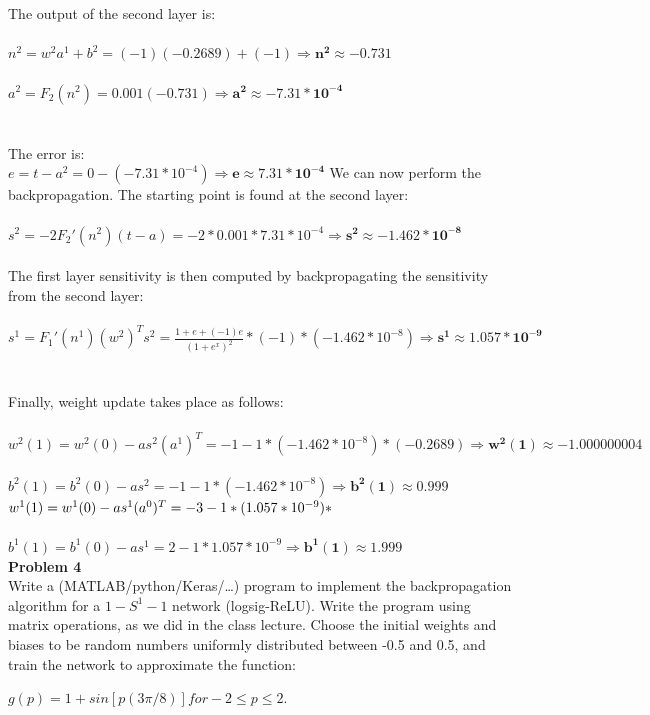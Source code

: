 \documentclass{article}
\begin{document}
\noindent \\ \\The output of the second layer is: \\ \\$n^2 = w^2a^1 + b^2 = (-1)(-0.2689) + (-1) \Rightarrow \bm{n^2 \approx -0.731}$
\\ \\$a^2 = F_2(n^2) = 0.001(-0.731) \Rightarrow \bm{a^2 \approx -7.31 * 10^{-4}}$
\\ \\ \\The error is: \\$e = t - a^2 = 0 - (-7.31 * 10^{-4}) \Rightarrow \bm{e \approx 7.31 * 10^{-4}}$ 
\newpage 
\noindent We can now perform the backpropagation. The starting point is found at the second layer: \\ \\
$s^2 = -2F_2'(n^2)(t-a) = -2 * 0.001 * 7.31 * 10^{-4} \Rightarrow \bm{s^2 \approx -1.462 * 10^{-8}}$
\\\\ The first layer sensitivity is then computed by backpropagating the sensitivity from the second layer: \\ \\ $s^1 = F_1'(n^1)(w^2)^Ts^2 = \frac{1+e+(-1)e}{(1+e^x)^2} * (-1) *(-1.462 * 10^{-8}) \Rightarrow \bm{s^1 \approx 1.057 * 10^{-9}}$
\\\\ \\Finally, weight update takes place as follows: \\\\
$w^2(1) = w^2(0) - as^2(a^1)^T = -1 -1 * (-1.462 * 10 ^{-8}) * (-0.2689) \Rightarrow \bm{w^2(1) \approx -1.000000004}$
\\ \\ $b^2(1) = b^2(0) -as^2 = -1 -1 * (-1.462 * 10 ^ {-8}) \Rightarrow \bm{b^2(1) \approx 0.999}$
$\\ \\ \\ w^1(1) = w^1(0) -as^1(a^0)^T = -3 -1 * (1.057 * 10^{-9}) * $ 
\\ \\$b^1(1) = b^1(0) - as^1 = 2 - 1 * 1.057 * 10^{-9} \Rightarrow \bm{b^1(1) \approx 1.999}$\\ 

\newpage
\noindent \textbf{Problem 4} \\

\noindent Write a (MATLAB/python/Keras/…) program to implement the backpropagation
algorithm for a $1-S^1-1$ network (logsig-ReLU). Write the program using matrix
operations, as we did in the class lecture. Choose the initial weights and biases to be
random numbers uniformly distributed between -0.5 and 0.5, and train the network to
approximate the function:
\begin{center}
  $ g(p)=1+sin[p(3 \pi /8)] for -2 \leq p \leq 2.$
\end{center}
\end{document}
